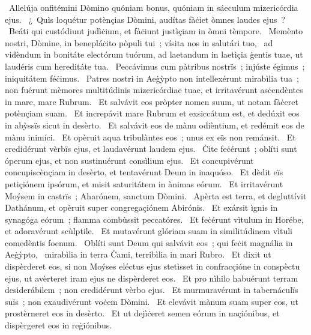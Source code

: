 {~Allelúja}
{%
onfitémini Dòmino quóniam bonus, quóniam in sáeculum mizericórdia ejus.
~¿~Quìs loquétur potènçias Dòmini, audítas fàċiet òmnes laudes ejus~?
~Beáti qui custódiunt judìċium, et fàċiunt justìçiam in òmni tèmpore.
~Memènto nostri, Dòmine, in benepláċito pòpuli tui~; vísita nos in salutári tuo,
~ad vidèndum in bonitáte electórum tuórum, ad laetandum in laetìçia ġentis tuae, ut laudéris cum hereditáte tua.
~Peccávimus cum pàtribus nostrïs~; injúste égimus~; iniquitátem féċimus.
~Patres nostri in Aeġỳpto non intellexérunt mirabìlia tua~; non fuérunt mèmores multitúdinis mizericórdiae tuae, et irritavérunt asċendèntes in mare, mare Rubrum.
~Et salvávit eos pròpter nomen suum, ut notam fàċeret potènçiam suam.
~Et increpávit mare Rubrum et exsiccátum est, et dedúxit eos in abỳssïs sicut in desèrto.
~Et salvávit eos de mànu odièntium, et redémit eos de mànu inimíci.
~Et opèruit aqua tribulàntes eos~; unus ex eïs non remánsit.
~Et credidérunt vèrbïs ejus, et laudavérunt laudem ejus.
~Ċite feċérunt~; oblíti sunt óperum ejus, et non sustinuérunt consìlium ejus.
~Et concupivérunt concupiscènçiam in desèrto, et tentavérunt Deum in inaquóso.
~Et dèdit eïs petiçiónem ipsórum, et misit saturitátem in ànimas eórum.
~Et irritavérunt Moýsem in castrïs~; Aharónem, sanctum Dòmini.
~Apèrta est terra, et degluttívit Dathánum, et opèruit super congregaçiónem Abirónis.
~Et exársit ìgnis in synagóga eórum~; flamma combùssit peccatóres.
~Et feċérunt vìtulum in Horébe, et adoravérunt scùlptile.
~Et mutavérunt glóriam suam in similitúdinem vìtuli comedèntis foenum.
~Oblíti sunt Deum qui salvávit eos~; qui feċit magnália in Aeġỳpto,
~mirabìlia in terra Ċami, terribìlia in mari Rubro.
~Et dixit ut dispèrderet eos, si non Moýses eléctus ejus stetìsset in confracçióne in conspèctu ejus, ut avèrteret iram ejus ne dispèrderet eos.
~Et pro nìhilo habuérunt terram desiderábilem~; non credidérunt vèrbo ejus.
~Et murmuravérunt in tabernáculïs suïs~; non exaudivérunt voċem Dòmini.
~Et elevávit mànum suam super eos, ut prostèrneret eos in desèrto.
~Et ut dejìċeret semen eórum in naçiónibus, et dispèrgeret eos in reġiónibus.
}
